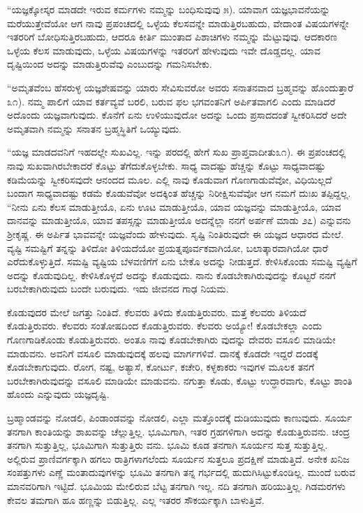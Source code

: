 “ಯಜ್ಞಕ್ಕೋಸ್ಕರ ಮಾಡದೇ ಇರುವ ಕರ್ಮಗಳು ನಮ್ಮನ್ನು ಬಂಧಿಸುವುವು ೫). ಯಾವಾಗ ಯಜ್ಞಭಾವನೆಯನ್ನು ಮರೆಯುತ್ತೇವೆಯೋ ಆಗ ನಾವು ಪ್ರಪಂಚದಲ್ಲಿ ಒಳ್ಳೆಯ ಕೆಲಸವನ್ನೇ ಮಾಡುತ್ತಿರಬಹುದು, ವೇದಾಂತ ವಿಷಯಗಳನ್ನೇ ಇತರರಿಗೆ ಬೋಧಿಸುತ್ತಿರಬಹುದು, ಆದರೂ ಕೀರ್ತಿ ಮುಂತಾದ ಪಿಶಾಚಿಗಳು ನಮ್ಮನ್ನು ಮೆಟ್ಟುವುವು. ಆದಕಾರಣ ಒಳ್ಳೆಯ ಕೆಲಸ ಮಾಡುವುದು, ಒಳ್ಳೆಯ ವಿಷಯಗಳನ್ನು ಇತರರಿಗೆ ಹೇಳುವುದು ಇವೇ ದೊಡ್ಡದಲ್ಲ. ಯಾವ ದೃಷ್ಟಿಯಿಂದ ಅದನ್ನು ಮಾಡುತ್ತಿರುವೆವು ಎಂಬುದನ್ನು ಗಮನಿಸಬೇಕು.

“ಅಮೃತವೆಂಬ ಹೆಸರುಳ್ಳ ಯಜ್ಞಶೇಷವನ್ನು ಯಾರು ಸೇವಿಸುವರೋ ಅವರು ಸನಾತನವಾದ ಬ್ರಹ್ಮವನ್ನು ಹೊಂದುತ್ತಾರೆ ೩೧). ನಮ್ಮ ಪಾಲಿಗೆ ಯಾವ ಕರ್ತವ್ಯವೆ ಬರಲಿ, ಬರುವ ಫಲ ಭಗವಂತನಿಗೆ ಅರ್ಪಿತವಾಗಲಿ ಎಂದು ಮಾಡಿದರೆ ಅದೊಂದು ಯಜ್ಞವಾಗುವುದು. ಕೊನೆಗೆ ಏನು ಉಳಿಯುವುದೋ ಅದನ್ನು ಒಂದು ಪ್ರಸಾದದಂತೆ ಸ್ವೀಕರಿಸಿದರೆ ಅದೇ ಅಮೃತವಾಗಿ ನಮ್ಮನ್ನು ಸನಾತನ ಬ್ರಹ್ಮಸ್ಥಿತಿಗೆ ಒಯ್ಯುವುದು.

“ಯಜ್ಞ ಮಾಡದವನಿಗೆ ಇಹದಲ್ಲೇ ಸುಖವಿಲ್ಲ. ಇನ್ನು ಪರದಲ್ಲಿ ಹೇಗೆ ಸುಖ ಪ್ರಾಪ್ತವಾದೀತು೩೧). ಈ ಪ್ರಪಂಚದಲ್ಲಿ ನಾವು ಸುಖವಾಗಿರಬೇಕಾದರೆ ಕೊಟ್ಟು ತೆಗೆದುಕೊಳ್ಳಬೇಕು. ಸಾಧ್ಯ ವಾದಷ್ಟು ಹೆಚ್ಚನ್ನು ಕೊಟ್ಟು ಸಾಧ್ಯವಾದಷ್ಟು ಕಡಿಮೆಯನ್ನು ಸ್ವೀಕರಿಸವುದೇ ಆನಂದದ ಮೂಲ. ಎಲ್ಲಿ ನಾವು ಕೊಡುವಾಗ ಗೊಣಗಾಡುವೆವೋ, ವಿಧಿಯಿಲ್ಲದೆ ಬಂದಾಗ ಸಾಧ್ಯವಾದಷ್ಟು ಕಡಮೆ ಕೊಡುವೆವೋ ಅದಕ್ಕಿಂತ ಹೆಚ್ಚನ್ನು ನಿರೀಕ್ಷಿಸುವೆವೋ ಆಗ ನಮಗೆ ದುಃಖ ತಪ್ಪಿದ್ದಲ್ಲ. “ನೀನು ಏನು ಕೆಲಸ ಮಾಡುತ್ತೀಯೊ, ಏನು ಊಟ ಮಾಡುತ್ತೀಯೊ, ಯಾವ ಯಜ್ಞವನ್ನು ಮಾಡುತ್ತೀಯೊ, ಯಾವ ದಾನವನ್ನು ಮಾಡುತ್ತೀಯೊ, ಯಾವ ತಪಸ್ಸನ್ನು ಮಾಡುತ್ತೀಯೊ ಅದನ್ನೆಲ್ಲಾ ನನಗೆ ಅರ್ಪಣೆ ಮಾಡು ೨೭) ಎನ್ನುವನು ಶ್ರೀಕೃಷ್ಣ. ಈ ಅರ್ಪಿತ ಭಾವವನ್ನೇ ಯಜ್ಞವೆಂದು ಹೇಳುವುದು. ಸೃಷ್ಟಿ ನಿಂತಿರುವುದೇ ಈ ಯಜ್ಞದ ಆಧಾರದ ಮೇಲೆ. ವ್ಯಷ್ಟಿ ಸಮಷ್ಟಿಗೆ ತನ್ನನ್ನು ತಿಳಿದೋ ತಿಳಿಯದೆಯೋ ಪ್ರಯತ್ನಪೂರ್ವಕವಾಗಿಯೋ, ಬಲಾತ್ಕಾರವಾಗಿಯೋ ಧಾರೆ ಎರೆದುಕೊಳ್ಳುತ್ತಿದೆ. ಸಮಷ್ಟಿ ವ್ಯಷ್ಟಿಯ ಬೆಳವಣಿಗೆಗೆ ಏನು ಬೇಕೊ ಅದನ್ನು ನೀಡುತ್ತದೆ. ಕೇಳಿಸಿಕೊಂಡು ಸಮಷ್ಟಿ ವ್ಯಷ್ಟಿಗೆ ಅದನ್ನು ಕೊಡುವುದಿಲ್ಲ. ಕೇಳಿಸಿಕೊಳ್ಳದೆ ಅದನ್ನು ಕೊಡುವುದು. ನಾನು ಕೊಡಬೇಕಾಗಿರುವುದನ್ನು ಕೊಟ್ಟರೆ ನನಗೆ ಬರಬೇಕಾಗಿರುವುದು ಬಂದೇ ಬರುವುದು. ಇದು ಜೀವನದ ಗಾಢ ನಿಯಮ.

ಕೊಡುವುದರ ಮೇಲೆ ಜಗತ್ತು ನಿಂತಿದೆ. ಕೆಲವರು ತಿಳಿದು ಕೊಡುತ್ತಿರುವರು. ಮತ್ತೆ ಕೆಲವರು ತಿಳಿಯದೆ ಕೊಡುತ್ತಿರುವರು. ಕೆಲವರು ಸಂತೋಷದಿಂದ ಕೊಡುತ್ತಿರುವರು. ಕೆಲವರು ಅಯ್ಯೋ! ಕೊಡಬೇಕಲ್ಲಾ ಎಂದು ಗೊಣಗಾಡಿಕೊಂಡು ಕೊಡುತ್ತಿರುವರು. ಅಂತೂ ನಾವು ಕೊಡಬೇಕಾಗಿರು ವುದನ್ನು ದೇವರು ವಸೂಲಿ ಮಾಡಿಯೇ ಮಾಡುವನು. ಅವನಿಗೆ ವಸೂಲಿ ಮಾಡುವುದಕ್ಕೆ ಹಲವು ಮಾರ್ಗಗಳಿವೆ. ದಾನಕ್ಕೆ ಕೊಡದೇ ಇದ್ದರೆ ದಂಡಕ್ಕೆ ಕೊಡಬೇಕಾಗುವುದು. ರೋಗ, ನಷ್ಟ, ಅತ್ಯಾಸೆ, ಕೋರ್ಟು, ಕಚೇರಿ, ಕಳ್ಳಕಾಕರು ಇವುಗಳ ಮೂಲಕ ತನಗೆ ಬರಬೇಕಾಗಿರುವುದನ್ನು ವಸೂಲಿ ಮಾಡಿಯೇ ಮಾಡುವನು. ನಗುತ್ತಾ ಕೊಡು, ಕೊಟ್ಟು ಉದ್ಧಾರವಾಗು, ಕೊಟ್ಟು ಶಾಂತಿ ಹೊಂದು ಎನ್ನುವುದು ಯಜ್ಞದೃಷ್ಟಿ.

ಬ್ರಹ್ಮಾಂಡವನ್ನು ನೋಡಲಿ, ಪಿಂಡಾಂಡವನ್ನು ನೋಡಲಿ, ಎಲ್ಲಾ ಮತ್ತೊಂದಕ್ಕೆ ದುಡಿಯುವುದು ಕಾಣುವುದು. ಸೂರ್ಯ ತನಗಾಗಿ ಕಾಂತಿಯನ್ನು ಶಾಖವನ್ನು ಚೆಲ್ಲುತ್ತಿಲ್ಲ. ಭೂಮಿಗಾಗಿ, ಇತರ ಗ್ರಹಗಳಿಗಾಗಿ ಅದನ್ನು ಕೊಡುತ್ತಿರುವನು. ಚಂದ್ರ ತನಗಾಗಿ ಸುತ್ತುತ್ತಿಲ್ಲ, ಭೂಮಿಗಾಗಿ ಸುತ್ತುತ್ತಿರು ವನು. ಭೂಮಿ ಕೂಡ ತನಗಾಗಿ ಸೂರ್ಯನ ಸುತ್ತ ಸುತ್ತುತ್ತಿಲ್ಲ. ಅಲ್ಲಿರುವ ಪ್ರಾಣಿವರ್ಗಕ್ಕಾಗಿ ಹಗಲು ರಾತ್ರಿಗಳಾಗಲೆಂದು ಸೂರ್ಯನ ಸುತ್ತಲೂ ಪ್ರದಕ್ಷಿಣೆ ಮಾಡುತ್ತಿದೆ. ಅನೇಕ ಖನಿಜ ಸಂಪತ್ತುಗಳು ಎಣ್ಣೆ ಮಂತಾದುವುಗಳನ್ನು ಭೂಮಿ ತನಗಾಗಿ ತನ್ನ ಗರ್ಭದಲ್ಲಿ ಹುದುಗಿಸಿಟ್ಟುಕೊಂಡಿಲ್ಲ. ಮುಂದೆ ಬರುವ ಮಾನವರಿಗಾಗಿ ಇಟ್ಟಿದೆ. ಭೂಮಿಯ ಮೇಲಿರುವ ಬೆಟ್ಟ ತನಗಾಗಿ ಇಲ್ಲ. ನದಿ ತನಗಾಗಿ ಹರಿಯುತ್ತಿಲ್ಲ. ಗಿಡಮರಗಳು ಕೇವಲ ತಮಗಾಗಿ ಹೂ ಹಣ್ಣನ್ನು ಬಿಡುತ್ತಿಲ್ಲ. ಎಲ್ಲ ಇತರರ ಸೌಕರ್ಯಕ್ಕಾಗಿ ಬಾಳುತ್ತಿವೆ.


